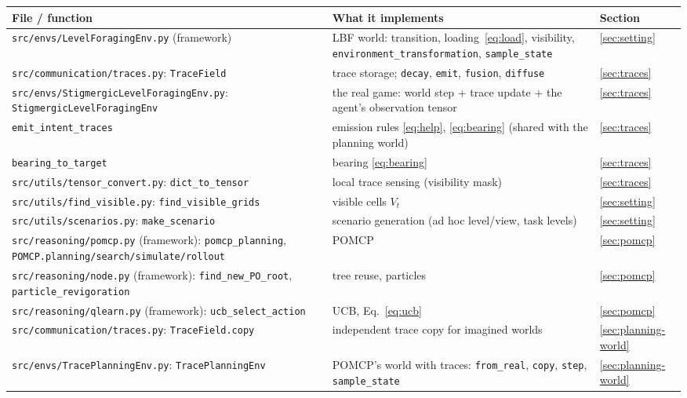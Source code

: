 \documentclass[11pt,a4paper]{article}
\newcommand{\file}{\nolinkurl}  %
\newcommand{\code}[1]{\texttt{#1}}
\theoremstyle{remark}
\begin{document}
\begin{center}
\small
\begin{tabular}{p{5.2cm}p{7.3cm}l}
\toprule
File / function & What it implements & Section \\
\midrule
\file{src/envs/LevelForagingEnv.py} (framework) & LBF world: transition, loading~\eqref{eq:load}, visibility,
  \code{environment\_transformation}, \code{sample\_state} & \ref{sec:setting} \\
\file{src/communication/traces.py}: \code{TraceField} & trace storage; \code{decay}, \code{emit}, \code{fusion},
  \code{diffuse} & \ref{sec:traces} \\
\file{src/envs/StigmergicLevelForagingEnv.py}: \code{StigmergicLevelForagingEnv} & the real game: world step + trace
  update + the agent's observation tensor & \ref{sec:traces} \\
\quad\code{emit\_intent\_traces} & emission rules \eqref{eq:help}, \eqref{eq:bearing} (shared with the planning world) &
  \ref{sec:traces} \\
\quad\code{bearing\_to\_target} & bearing \eqref{eq:bearing} & \ref{sec:traces} \\
\file{src/utils/tensor_convert.py}: \code{dict\_to\_tensor} & local trace sensing (visibility mask) & \ref{sec:traces} \\
\file{src/utils/find_visible.py}: \code{find\_visible\_grids} & visible cells $V_t$ & \ref{sec:setting} \\
\file{src/utils/scenarios.py}: \code{make\_scenario} & scenario generation (ad hoc level/view, task levels) &
  \ref{sec:setting} \\
\file{src/reasoning/pomcp.py} (framework): \code{pomcp\_planning}, \code{POMCP.planning/search/simulate/rollout} &
  POMCP & \ref{sec:pomcp} \\
\file{src/reasoning/node.py} (framework): \code{find\_new\_PO\_root}, \code{particle\_revigoration} & tree reuse,
  particles & \ref{sec:pomcp} \\
\file{src/reasoning/qlearn.py} (framework): \code{ucb\_select\_action} & UCB, Eq.~\eqref{eq:ucb} & \ref{sec:pomcp} \\
\file{src/communication/traces.py}: \code{TraceField.copy} & independent trace copy for imagined worlds &
  \ref{sec:planning-world} \\
\file{src/envs/TracePlanningEnv.py}: \code{TracePlanningEnv} & POMCP's world with traces: \code{from\_real},
  \code{copy}, \code{step}, \code{sample\_state} & \ref{sec:planning-world} \\

\end{tabular}
\end{center}
\end{document}
